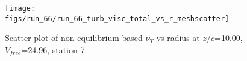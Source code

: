 \begin{figure}[H]
\centering
\texttt{[image: figs/run\_66/run\_66\_turb\_visc\_total\_vs\_r\_meshscatter]}
\caption{Scatter plot of non-equilibrium based $\nu_T$ vs radius at $z/c$=10.00, $V_{free}$=24.96, station 7.}
\label{fig:run_66_turb_visc_total_vs_r_meshscatter}
\end{figure}


